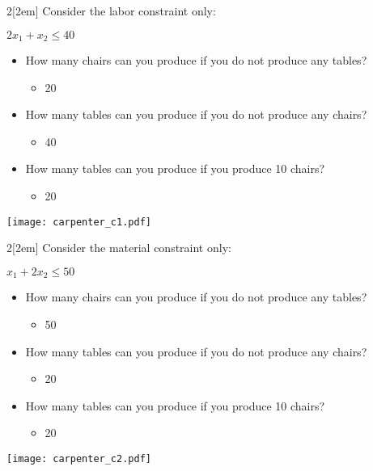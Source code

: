 \documentclass[11pt]{beamer}
\begin{document}
\begin{frame}

\begin{multicols}{2}[\columnsep2em] 
Consider the labor constraint only: 

$2 x_1 + x_2  \leq 40$
\begin{itemize}
\item<1-> How many chairs can you produce if you do not produce any tables?
\pause
\begin{itemize}
\item 20
\end{itemize}
\item<2-> How many tables can you produce if you do not produce any chairs?
\pause
\begin{itemize}
\item 40
\end{itemize}
\item<3-> How many tables can you produce if you produce 10 chairs?
\pause
\begin{itemize}
\item 20
\end{itemize}
\end{itemize}
\columnbreak
\pause
\texttt{[image: carpenter\_c1.pdf]}%


\end{multicols}

\end{frame}


\begin{frame}

\begin{multicols}{2}[\columnsep2em] 
Consider the material constraint only: 

$x_1 + 2x_2  \leq 50$
\begin{itemize}
\item<1-> How many chairs can you produce if you do not produce any tables?
\pause
\begin{itemize}
\item 50
\end{itemize}
\item<2-> How many tables can you produce if you do not produce any chairs?
\pause
\begin{itemize}
\item 20
\end{itemize}
\item<3-> How many tables can you produce if you produce 10 chairs?
\pause
\begin{itemize}
\item 20
\end{itemize}
\end{itemize}
\columnbreak
\pause
\texttt{[image: carpenter\_c2.pdf]}%


\end{multicols}

\end{frame}
\end{document}
